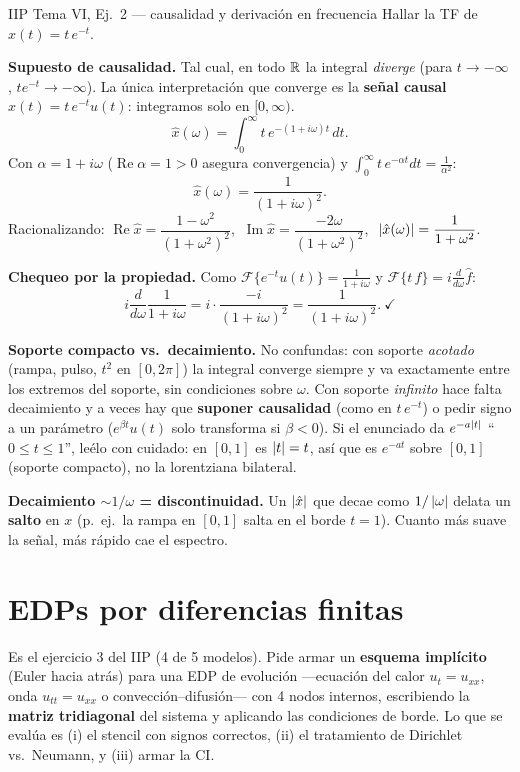 \begin{ejemplo}{IIP Tema VI, Ej.\ 2 — causalidad y derivación en frecuencia}
Hallar la TF de $x(t)=t\,e^{-t}$.

\medskip
\textbf{Supuesto de causalidad.} Tal cual, en todo $\mathbb{R}$ la integral \emph{diverge} (para $t\to-\infty$, $t e^{-t}\to-\infty$). La única interpretación que converge es la \textbf{señal causal} $x(t)=t\,e^{-t}u(t)$: integramos solo en $[0,\infty)$.
\[
\hat x(\omega)=\int_0^\infty t\,e^{-(1+i\omega)t}\,dt.
\]
Con $\alpha=1+i\omega$ ($\operatorname{Re}\alpha=1>0$ asegura convergencia) y $\int_0^\infty t\,e^{-\alpha t}dt=\tfrac{1}{\alpha^2}$:
\[
\boxed{\;\hat x(\omega)=\frac{1}{(1+i\omega)^2}.\;}
\]
Racionalizando: $\operatorname{Re}\hat x=\dfrac{1-\omega^2}{(1+\omega^2)^2}$, $\ \operatorname{Im}\hat x=\dfrac{-2\omega}{(1+\omega^2)^2}$, $\ \left\lvert \hat x(\omega) \right\rvert=\dfrac{1}{1+\omega^2}$.

\textbf{Chequeo por la propiedad.} Como $\mathcal F\{e^{-t}u(t)\}=\tfrac{1}{1+i\omega}$ y $\mathcal F\{t\,f\}=i\tfrac{d}{d\omega}\hat f$:
\[
i\frac{d}{d\omega}\frac{1}{1+i\omega}=i\cdot\frac{-i}{(1+i\omega)^2}=\frac{1}{(1+i\omega)^2}.\ \checkmark
\]
\end{ejemplo}

\begin{truco}
\textbf{Soporte compacto vs.\ decaimiento.} No confundas: con soporte \emph{acotado} (rampa, pulso, $t^2$ en $[0,2\pi]$) la integral converge siempre y va exactamente entre los extremos del soporte, sin condiciones sobre $\omega$. Con soporte \emph{infinito} hace falta decaimiento y a veces hay que \textbf{suponer causalidad} (como en $t\,e^{-t}$) o pedir signo a un parámetro ($e^{\beta t}u(t)$ solo transforma si $\beta<0$). Si el enunciado da $e^{-a\left\lvert t \right\rvert}$ ``$0\le t\le1$'', leélo con cuidado: en $[0,1]$ es $\left\lvert t \right\rvert=t$, así que es $e^{-at}$ sobre $[0,1]$ (soporte compacto), no la lorentziana bilateral.

\textbf{Decaimiento $\sim1/\omega$ = discontinuidad.} Un $\left\lvert \hat x \right\rvert$ que decae como $1/\left\lvert \omega \right\rvert$ delata un \textbf{salto} en $x$ (p.\ ej.\ la rampa en $[0,1]$ salta en el borde $t=1$). Cuanto más suave la señal, más rápido cae el espectro.
\end{truco}

\section{EDPs por diferencias finitas}

Es el ejercicio 3 del IIP (4 de 5 modelos). Pide armar un \textbf{esquema implícito} (Euler hacia atrás) para una EDP de evolución —ecuación del calor $u_t=u_{xx}$, onda $u_{tt}=u_{xx}$ o convección--difusión— con 4 nodos internos, escribiendo la \textbf{matriz tridiagonal} del sistema y aplicando las condiciones de borde. Lo que se evalúa es (i) el stencil con signos correctos, (ii) el tratamiento de Dirichlet vs.\ Neumann, y (iii) armar la CI.

